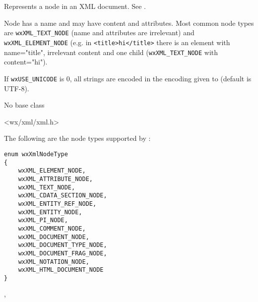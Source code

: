 
\section{}\label{wxxmlnode}

Represents a node in an XML document. See .

Node has a name and may have content and attributes. Most common node types are 
{\tt wxXML\_TEXT\_NODE} (name and attributes are irrelevant) and 
{\tt wxXML\_ELEMENT\_NODE} (e.g. in {\tt <title>hi</title>} there is an element
with name="title", irrelevant content and one child ({\tt wxXML\_TEXT\_NODE}
with content="hi").

If \texttt{wxUSE\_UNICODE} is 0, all strings are encoded in the encoding given to
 (default is UTF-8).



No base class


<wx/xml/xml.h>




The following are the node types supported by :

{\small
\begin{verbatim}
enum wxXmlNodeType
{
    wxXML_ELEMENT_NODE,
    wxXML_ATTRIBUTE_NODE,
    wxXML_TEXT_NODE,
    wxXML_CDATA_SECTION_NODE,
    wxXML_ENTITY_REF_NODE,
    wxXML_ENTITY_NODE,
    wxXML_PI_NODE,
    wxXML_COMMENT_NODE,
    wxXML_DOCUMENT_NODE,
    wxXML_DOCUMENT_TYPE_NODE,
    wxXML_DOCUMENT_FRAG_NODE,
    wxXML_NOTATION_NODE,
    wxXML_HTML_DOCUMENT_NODE
}
\end{verbatim}
}


, 


